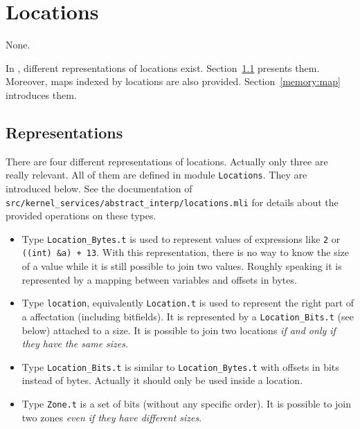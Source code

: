 
\section{Locations}\label{adv:memory}

\begin{prereq}
  None.
\end{prereq}

In \framac, different representations of \C locations
exist. Section~\ref{memory:repr} presents them. Moreover, maps indexed by
locations are also provided. Section~\ref{memory:map} introduces them.

\subsection{Representations}\label{memory:repr}

There are four different representations of \C locations. Actually only three
are really relevant. All of them are defined in module
\texttt{Locations}. They are introduced below. See the
documentation of \texttt{src/kernel\_services/abstract\_interp/locations.mli}
for details about the provided operations on these types.

\begin{itemize}
\item Type \texttt{Location\_Bytes.t}
  is used to represent values of \C expressions like \texttt{2} or
  \texttt{((int) \&a) + 13}. With this representation, there is no way to know
  the size of a value while it is still possible to join two values. Roughly
  speaking it is represented by a mapping between \C variables and offsets in
  bytes.
\item Type \texttt{location}, equivalently
  \texttt{Location.t} is used to represent the
  right part of a \C affectation (including bitfields). It is represented by a
  \texttt{Location\_Bits.t} (see below) attached to a size. It is possible to
  join two locations \emph{if and only if they have the same sizes.}
\item Type \texttt{Location\_Bits.t} is
  similar to \texttt{Location\_Bytes.t} with offsets in bits instead of
  bytes. Actually it should only be used inside a location.
\item Type \texttt{Zone.t} is a set of bits (without
  any specific order). It is possible to join two zones \emph{even if they have
    different sizes}.
\end{itemize}

